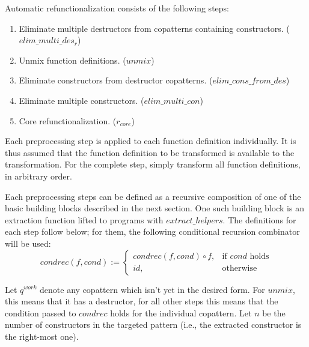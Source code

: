 Automatic refunctionalization consists of the following steps:
\begin{enumerate}
\item Eliminate multiple destructors from copatterns containing constructors. ($elim\_multi\_des_r$)

\item Unmix function definitions. ($unmix$)

\item Eliminate constructors from destructor copatterns. ($elim\_cons\_from\_des$)

\item Eliminate multiple constructors. ($elim\_multi\_con$)

\item Core refunctionalization. ($r_{core}$)

\end{enumerate}

Each preprocessing step is applied to each function definition individually. It is thus assumed that the function definition to be transformed is available to the transformation. For the complete step, simply transform all function definitions, in arbitrary order.

Each preprocessing steps can be defined as a recursive composition of one of the basic building blocks described in the next section. One such building block is an extraction function lifted to programs with $extract\_helpers$. The definitions for each step follow below; for them, the following conditional recursion combinator will be used:
\[
    condrec(f, cond) :=
\begin{cases}
    condrec(f, cond) \circ f,& \text{if $cond$ holds} \\
   id,& \text{otherwise}
\end{cases}
\]

Let $q^{work}$ denote any copattern which isn't yet in the desired form. For $unmix$, this means that it has a destructor, for all other steps this means that the condition passed to $condrec$ holds for the individual copattern. Let $n$ be the number of constructors in the targeted pattern (i.e., the extracted constructor is the right-most one).

